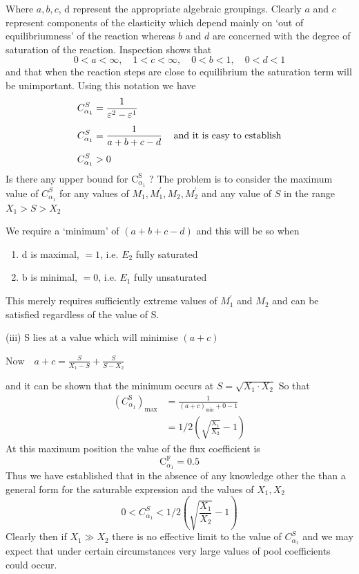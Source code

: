 Where $a, b, c$, d represent the appropriate algebraic groupings. Clearly $a$ and $c$ represent components of the elasticity which depend mainly on `out of equilibriumness' of the reaction whereas $b$ and $d$ are concerned with the degree of saturation of the reaction. Inspection shows that
%
$$
0<a<\infty, \quad 1<c<\infty, \quad 0<b<1, \quad 0<d<1
$$
%
and that when the reaction steps are close to equilibrium the saturation term will be unimportant. Using this notation we have
%
$$
\begin{aligned}
C_{\alpha_{1}}^{S} &=\frac{1}{\varepsilon^{2}-\varepsilon^{1}} \\[4pt]
C_{\alpha_{1}}^{S} &=\frac{1}{a+b+c-d} \hspace{12PT}\mbox{and it is easy to establish} \\[4pt]
C_{\alpha_{1}}^{S} &>0
\end{aligned}
$$
%
Is there any upper bound for $\mathrm{C}_{\alpha_{1}}^{\mathrm{S}}$ ? The problem is to consider the maximum value of $C_{\alpha_{1}}^{S}$ for any values of $M_{1}, M_{1}^{\prime}, M_{2}, M_{2}^{\prime}$ and any value of $S$ in the range $X_{1}> S > X_{2}$

We require a `minimum' of $(a+b+c-d)$ and this will be so when

\begin{enumerate}[label=(\roman*),parsep=-3pt]
\item d is maximal, $=1$, i.e. $E_{2}$ fully saturated

\item b is minimal, $=0$, i.e. $E_{1}$ fully unsaturated
\end{enumerate}

This merely requires sufficiently extreme values of $M_{1}^{\prime}$ and $M_{2}$ and can be satisfied regardless of the value of S.

(iii) S lies at a value which will minimise $(a+c)$

$\displaystyle \mbox{Now} \quad a+c=\frac{S}{X_{1}-S}+\frac{S}{S-X_{2}} $

and it can be shown that the minimum occurs at $S = \sqrt{X_{1} \cdot X_{2}}$ So that
%
$$
\begin{aligned}
\left(C_{\alpha_{1}}^{\mathrm{S}}\right)_{\max } & =\frac{1}{(a+c)_{\min}+0-1} \\[6pt]
& =1 / 2\left(\sqrt{\frac{\mathrm{X}_{1}}{\mathrm{X}_{2}}}-1\right)
\end{aligned}
$$
%
At this maximum position the value of the flux coefficient is
%
$$
\mathrm{C}_{\alpha_{1}}^{\mathrm{F}} = 0.5
$$
%
Thus we have established that in the absence of any knowledge other the than a general form for the saturable expression and the values of $X_{1}, X_{2}$
%
$$
0 < C_{\alpha_{1}}^{S} < 1/2\left(\sqrt{\frac{X_{1}}{X_{2}}}-1\right)
$$
%
Clearly then if $X_{1} \gg X_{2}$ there is no effective limit to the value of $C_{\alpha_{1}}^{S}$ and we may expect that under certain circumstances very large values of pool coefficients could occur.

